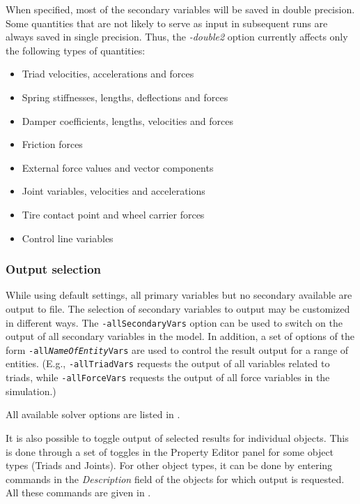 When specified,
most of the secondary variables will be saved in double precision.
Some quantities that are not likely to serve as input in subsequent runs
are always saved in single precision. Thus, the
{\sl-double2} option currently affects only the following types of quantities:

\begin{itemize}
\item Triad velocities, accelerations and forces
\item Spring stiffnesses, lengths, deflections and forces
\item Damper coefficients, lengths, velocities and forces
\item Friction forces
\item External force values and vector components
\item Joint variables, velocities and accelerations
\item Tire contact point and wheel carrier forces
\item Control line variables
\end{itemize}

\subsubsection{Output selection}

While using default settings, all primary variables but no secondary available
are output to file. The selection of secondary variables to output may be
customized in different ways. The {\tt-allSecondaryVars} option can be used to
switch on the output of all secondary variables in the model.
In addition, a set of options of the form {\tt-all{\sl NameOfEntity}Vars}
are used to control the result output for a range of entities.
(E.g., {\tt-allTriadVars} requests the output of all variables related to
triads, while {\tt-allForceVars} requests the output of all force variables
in the simulation.)

All available solver options are listed in
.

It is also possible to toggle output of selected results for individual objects.
This is done through a set of toggles in the Property Editor panel for some
object types (Triads and Joints). For other object types, it can be done by
entering commands in the {\sl Description} field of the objects for which
output is requested. All these commands are given
in .

